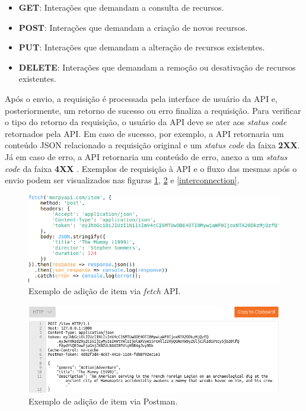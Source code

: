 \documentclass[12pt, openright, oneside, a4paper, brazil]{abntex2}
\begin{document}
\begin{itemize}
	\item \textbf{GET}: Interações que demandam a consulta de recursos.

	\item \textbf{POST}: Interações que demandam a criação de novos recursos.

	\item \textbf{PUT}: Interações que demandam a alteração de recursos existentes.

	\item \textbf{DELETE}: Interações que demandam a remoção ou desativação de recursos existentes.
\end{itemize}

Após o envio, a requisição é processada pela interface de usuário da API e, posteriormente, um retorno de sucesso ou erro finaliza a requisição. Para verificar o tipo do retorno da requisição, o usuário da API deve se ater aos \textit{status code} retornados pela API. Em caso de sucesso, por exemplo, a API retornaria um conteúdo JSON relacionado a requisição original e um \textit{status code} da faixa \textbf{2XX}. Já em caso de erro, a API retornaria um conteúdo de erro, anexo a um \textit{status code} da faixa \textbf{4XX} \cite{fielding1999hypertext}. Exemplos de requisição à API e o fluxo das mesmas após o envio podem ser visualizados nas figuras \ref{fetch_api}, \ref{postman} e \ref{interconnection}.

\begin{figure}[htp]
	\caption{\label{fetch_api}Exemplo de adição de item via \textit{fetch} API.}
	\begin{center}
		\includegraphics[scale=0.8]{images/fetch_api.png}
	\end{center}
	\hspace{5.5cm}{Fonte: O Autor.}
\end{figure}

\begin{figure}[htp]
	\caption{\label{postman}Exemplo de adição de item via Postman.}
	\begin{center}
		\includegraphics[scale=0.85]{images/postman.png}
	\end{center}
	\hspace{5.5cm}{Fonte: O Autor.}
\end{figure}
\end{document}
